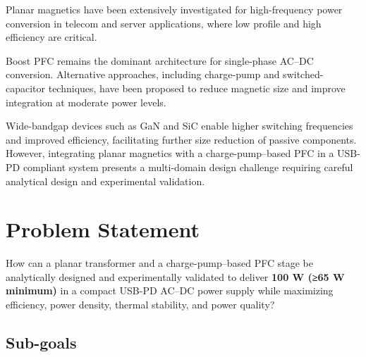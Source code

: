 \documentclass[12pt,a4paper]{report}
\begin{document}
Planar magnetics have been extensively investigated for high-frequency power conversion in telecom and server applications, where low profile and high efficiency are critical.

Boost PFC remains the dominant architecture for single-phase AC--DC conversion. Alternative approaches, including charge-pump and switched-capacitor techniques, have been proposed to reduce magnetic size and improve integration at moderate power levels.

Wide-bandgap devices such as GaN and SiC enable higher switching frequencies and improved efficiency, facilitating further size reduction of passive components. However, integrating planar magnetics with a charge-pump--based PFC in a USB-PD compliant system presents a multi-domain design challenge requiring careful analytical design and experimental validation.

\section{Problem Statement}

How can a planar transformer and a charge-pump--based PFC stage be analytically designed and experimentally validated to deliver \textbf{100 W (≥65 W minimum)} in a compact USB-PD AC--DC power supply while maximizing efficiency, power density, thermal stability, and power quality?

\subsection*{Sub-goals}
\end{document}
